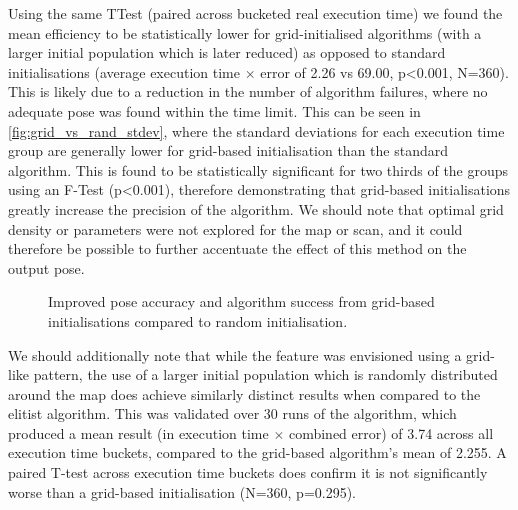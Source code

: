 \documentclass[authoryearcitations]{UoYCSproject}
\begin{document}
Using the same TTest (paired across bucketed real execution time) we found the mean efficiency to be statistically lower for grid-initialised algorithms (with a larger initial population which is later reduced) as opposed to standard initialisations (average execution time $\times$ error of 2.26 vs 69.00, p<0.001, N=360). This is likely due to a reduction in the number of algorithm failures, where no adequate pose was found within the time limit. This can be seen in \autoref{fig:grid_vs_rand_stdev}, where the standard deviations for each execution time group are generally lower for grid-based initialisation than the standard algorithm. This is found to be statistically significant for two thirds of the groups using an F-Test (p<0.001), therefore demonstrating that grid-based initialisations greatly increase the precision of the algorithm. We should note that optimal grid density or parameters were not explored for the map or scan, and it could therefore be possible to further accentuate the effect of this method on the output pose.

\datatablegridstdev

\begin{figure}
	\centering
	\caption[Grid vs. random population layout]{Improved pose accuracy and algorithm success from grid-based initialisations compared to random initialisation.}
	\label{fig:grid_vs_rand_stdev}
\end{figure}

We should additionally note that while the feature was envisioned using a grid-like pattern, the use of a larger initial population which is randomly distributed around the map does achieve similarly distinct results when compared to the elitist algorithm. This was validated over 30 runs of the algorithm, which produced a mean result (in execution time $\times$ combined error) of 3.74 across all execution time buckets, compared to the grid-based algorithm's mean of 2.255. A paired T-test across execution time buckets does confirm it is not significantly worse than a grid-based initialisation (N=360, p=0.295).
\end{document}
